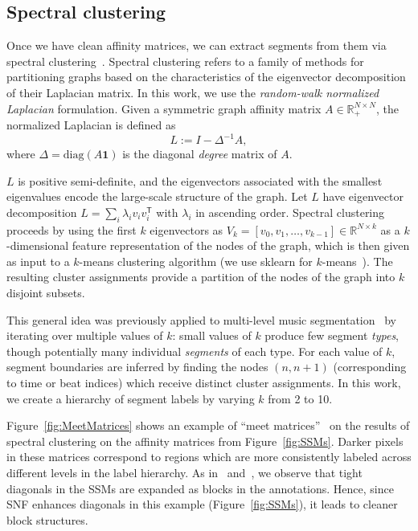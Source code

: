 \documentclass{article}
\begin{document}
\subsection{Spectral clustering}

Once we have clean affinity matrices, we can extract segments from them via spectral clustering~\cite{von2007tutorial}. Spectral clustering refers to a family of methods for partitioning graphs based on the characteristics of the eigenvector decomposition of their Laplacian matrix.
In this work, we use the \emph{random-walk normalized Laplacian} formulation.
Given a symmetric graph affinity matrix $A \in \mathbb{R}_+^{N\times N}$, the normalized Laplacian is defined as
\begin{equation}
L := I - \Delta^{-1}A,
\end{equation}
where $\Delta = \text{diag}(A\mathbf{1})$ is the diagonal \emph{degree} matrix of $A$.

$L$ is positive semi-definite, and the eigenvectors associated with the smallest eigenvalues encode the large-scale structure of the graph.
Let $L$ have eigenvector decomposition $L = \sum_i \lambda_i v_i v_i^\mathsf{T}$ with $\lambda_i$ in ascending order.
Spectral clustering proceeds by using the first $k$ eigenvectors as $V_k = [v_0, v_1, \dots, v_{k-1}] \in \mathbb{R}^{N \times k}$ as a $k$-dimensional feature representation of the nodes of the graph, which is then given as input to a $k$-means clustering algorithm (we use sklearn for $k$-means~\cite{pedregosa2011scikit}).
The resulting cluster assignments provide a partition of the nodes of the graph into $k$ disjoint subsets.

This general idea was previously applied to multi-level music segmentation~\cite{mcfee2014spectral} by iterating over multiple values of $k$: small values of $k$ produce few segment \emph{types}, though potentially many individual \emph{segments} of each type.
For each value of $k$, segment boundaries are inferred by finding the nodes $(n, n+1)$ (corresponding to time or beat indices) which receive distinct cluster assignments.  In this work, we create a hierarchy of segment labels by varying $k$ from 2 to 10. %

Figure~\ref{fig:MeetMatrices} shows an example of ``meet matrices''~\cite{mcfee2017evaluating} on the results of spectral clustering on the affinity matrices from Figure~\ref{fig:SSMs}.  Darker pixels in these matrices correspond to regions which are more consistently labeled across different levels in the label hierarchy. As in~\cite{grohganz2013converting} and~\cite{mcfee2014spectral}, we observe that tight diagonals in the SSMs are expanded as blocks in the annotations.  Hence, since SNF enhances diagonals in this example (Figure~\ref{fig:SSMs}), it leads to cleaner block structures.
\end{document}
